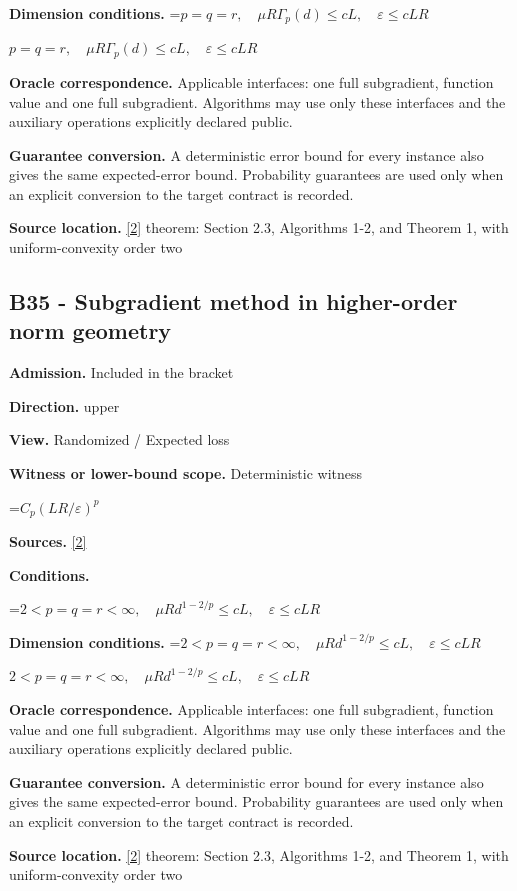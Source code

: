\documentclass[10pt,a4paper]{article}
\newcommand{\AtlasMath}[1]{\par\begingroup\centering\setbox0=\hbox{$\displaystyle #1$}\ifdim\wd0>1.4\linewidth\typeout{ATLAS WIDE FORMULA: \the\wd0}\fi\ifdim\wd0>\linewidth\resizebox{\linewidth}{!}{\box0}\else\box0\fi\par\endgroup}
\newcommand{\AtlasInlineMath}[1]{\begingroup\setbox0=\hbox{$#1$}\ifdim\wd0>.4\linewidth\endgroup\AtlasMath{#1}\else\endgroup$#1$\fi}
\begin{document}
\textbf{Dimension conditions.} \AtlasInlineMath{p=q=r,\quad\mu R\Gamma_p(d)\le cL,\quad\varepsilon\le cLR}

\textbf{Oracle correspondence.} Applicable interfaces: one full subgradient, function value and one full subgradient. Algorithms may use only these interfaces and the auxiliary operations explicitly declared public.

\textbf{Guarantee conversion.} A deterministic error bound for every instance also gives the same expected-error bound. Probability guarantees are used only when an explicit conversion to the target contract is recorded.

\textbf{Source location.} \href{https://arxiv.org/pdf/1401.1792}{[2]} theorem: Section 2.3, Algorithms 1-2, and Theorem 1, with uniform-convexity order two

\subsection{B35 - Subgradient method in higher-order norm geometry}
\textbf{Admission.} Included in the bracket

\textbf{Direction.} upper

\textbf{View.} Randomized / Expected loss

\textbf{Witness or lower-bound scope.} Deterministic witness

\AtlasMath{C_p(LR/\varepsilon)^p}
\textbf{Sources.} \href{https://arxiv.org/pdf/1401.1792}{[2]}

\textbf{Conditions.} 
\AtlasMath{2<p=q=r<\infty,\quad\mu R d^{1-2/p}\le cL,\quad\varepsilon\le cLR}


\textbf{Dimension conditions.} \AtlasInlineMath{2<p=q=r<\infty,\quad\mu R d^{1-2/p}\le cL,\quad\varepsilon\le cLR}

\textbf{Oracle correspondence.} Applicable interfaces: one full subgradient, function value and one full subgradient. Algorithms may use only these interfaces and the auxiliary operations explicitly declared public.

\textbf{Guarantee conversion.} A deterministic error bound for every instance also gives the same expected-error bound. Probability guarantees are used only when an explicit conversion to the target contract is recorded.

\textbf{Source location.} \href{https://arxiv.org/pdf/1401.1792}{[2]} theorem: Section 2.3, Algorithms 1-2, and Theorem 1, with uniform-convexity order two
\end{document}
